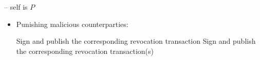 \begin{center}
\begin{processbox}{\pchan -- self is $P$}
\begin{itemize}
      \item Punishing malicious counterparties:
      \begin{algorithmic}[0]
        \State {}
          \State Sign and publish the corresponding revocation transaction
        \EndIf
          \State Sign and publish the corresponding revocation transaction(s)
        \EndIf
      \end{algorithmic}
    \end{itemize}
  \end{processbox}
  \label{code:pseudocode}
\end{center}
